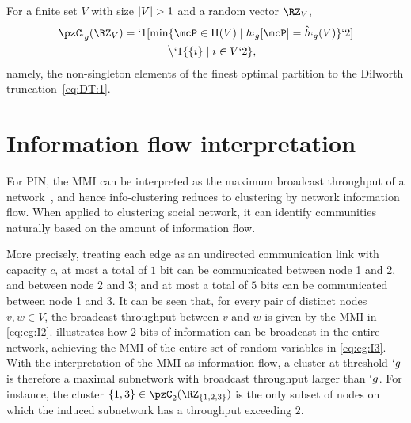 \documentclass[conference,letterpaper]{IEEEtran}
\begin{document}
\begin{Proposition}%
	\label{pro:PSP}
	For a finite set $V$ with size $\lvert V\rvert>1$ and a random vector $\RZ_V$,
	\begin{align}
		\begin{split}
	\pzC_{`g}(\RZ_V)
	&=`1[\min \Set{\mcP\in \Pi(V) \mid h_{`g}[\mcP]=\hat{h}_{`g}(V)}`2]\\ &\kern4em \big\backslash`1\{\Set{i}\mid i\in V`2\}, 
	   \end{split}
	\end{align}
namely, the non-singleton elements of the finest optimal partition to the Dilworth truncation~\eqref{eq:DT:1}.
\end{Proposition}


\section{Information flow interpretation}

For PIN, the MMI can be interpreted as the maximum broadcast throughput of a
network~\cite{chan11isit,chan12ud}, and hence info-clustering reduces to clustering by network information flow.
When applied to clustering social network, it can identify communities naturally based on the amount of information flow. 

More precisely, treating each edge as an undirected communication link with capacity $c$, at most a
total of $1$ bit can be communicated between node 1 and 2, and between node 2 and 3; and at most a total of $5$ bits
can be communicated between node 1 and 3. It can be seen that, for every pair of distinct
nodes $v,w \in V$, the broadcast throughput between $v$ and $w$ is given by the MMI in \eqref{eq:eg:I2}.
 illustrates how $2$ bits of information can be broadcast in the entire network,
achieving the MMI of the entire set of random variables in \eqref{eq:eg:I3}. 
With the interpretation of the MMI as information flow, a cluster at threshold $`g$ is therefore a
maximal subnetwork with broadcast throughput larger than $`g$. For instance, the cluster $\Set
{1,3}\in \pzC_2(\RZ_{\Set{1,2,3}})$ is the only subset of nodes on which the induced subnetwork has a
throughput exceeding $2$.
\end{document}

